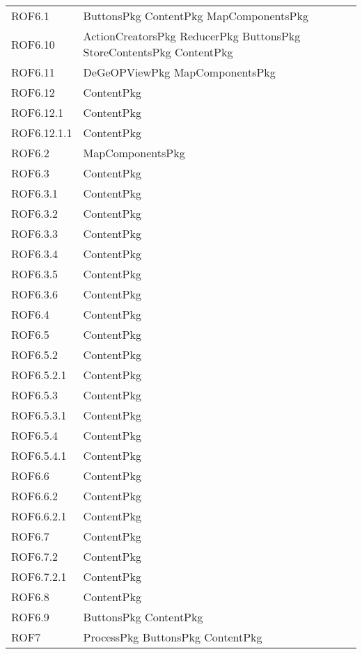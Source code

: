 \begin{longtable}{p{2.5cm}!{\VRule[1pt]}p{5cm}}
		ROF6.1 & ButtonsPkg \newline ContentPkg \newline MapComponentsPkg\\
		ROF6.10 & ActionCreatorsPkg \newline ReducerPkg \newline ButtonsPkg \newline StoreContentsPkg \newline ContentPkg\\
		ROF6.11 & DeGeOPViewPkg \newline MapComponentsPkg\\
		ROF6.12 & ContentPkg\\
		ROF6.12.1 & ContentPkg\\
		ROF6.12.1.1 & ContentPkg\\
		ROF6.2 & MapComponentsPkg\\
		ROF6.3 & ContentPkg\\
		ROF6.3.1 & ContentPkg\\
		ROF6.3.2 & ContentPkg\\
		ROF6.3.3 & ContentPkg\\
		ROF6.3.4 & ContentPkg\\
		ROF6.3.5 & ContentPkg\\
		ROF6.3.6 & ContentPkg\\
		ROF6.4 & ContentPkg\\
		ROF6.5 & ContentPkg\\
		ROF6.5.2 & ContentPkg\\
		ROF6.5.2.1 & ContentPkg\\
		ROF6.5.3 & ContentPkg\\
		ROF6.5.3.1 & ContentPkg\\
		ROF6.5.4 & ContentPkg\\
		ROF6.5.4.1 & ContentPkg\\
		ROF6.6 & ContentPkg\\
		ROF6.6.2 & ContentPkg\\
		ROF6.6.2.1 & ContentPkg\\
		ROF6.7 & ContentPkg\\
		ROF6.7.2 & ContentPkg\\
		ROF6.7.2.1 & ContentPkg\\
		ROF6.8 & ContentPkg\\
		ROF6.9 & ButtonsPkg \newline ContentPkg\\
		ROF7 & ProcessPkg \newline ButtonsPkg \newline ContentPkg\\

\end{longtable}
